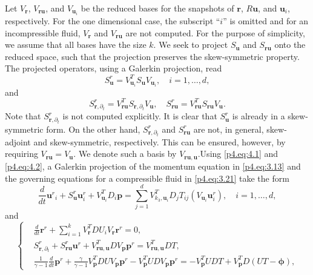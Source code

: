Let $V_{\mathbf r}$, $V_{\mathbf r \mathbf u}$, and $V_{\mathbf u_i}$ be the reduced bases for the snapshots of $\mathbf r$, $R \mathbf u$, and $\mathbf u_i$, respectively. For the one dimensional case, the subscript ``$i$'' is omitted and for an incompressible fluid, $V_{ \mathbf r}$ and $V_{\mathbf r \mathbf u}$ are not computed. For the purpose of simplicity, we assume that all bases have the size $k$. We seek to project $S_{\mathbf u}$ and $S_{\mathbf r \mathbf u}$ onto the reduced space, such that the projection preserves the skew-symmetric property. The projected operators, using a Galerkin projection, read
\begin{equation} \label{p4.eq:4.1}
	S^r _{\mathbf u} = V_{ \mathbf u_i}^T S _{\mathbf u} V_{ \mathbf u_i}, \quad i=1,\dots,d,
\end{equation}
and
\begin{equation} \label{p4.eq:4.2}
	S^r_{\mathbf r ,\partial_t} =V_{\mathbf r \mathbf u}^T  S_{\mathbf r ,\partial_t} V_{\mathbf u}, \quad S^r _{\mathbf r \mathbf u} = V_{\mathbf r \mathbf u}^T  S _{\mathbf r \mathbf u} V_{\mathbf u}.
\end{equation}
Note that $S^r_{\mathbf r ,\partial_t}$ is not computed explicitly. It is clear that $S^r _{\mathbf u}$ is already in a skew-symmetric form. On the other hand, $S^r_{\mathbf r ,\partial_t}$ and $S^r _{\mathbf r \mathbf u}$ are not, in general, skew-adjoint and skew-symmetric, respectively. This can be ensured, however, by requiring $V_{\mathbf r \mathbf u} = V_{\mathbf u}$. We denote such a basis by $V_{\mathbf r \mathbf u, \mathbf u}$.Using \eqref{p4.eq:4.1} and \eqref{p4.eq:4.2}, a Galerkin projection of the momentum equation in \eqref{p4.eq:3.13} and the governing equations for a compressible fluid in \eqref{p4.eq:3.21} take the form
\begin{equation} \label{p4.eq:4.3}
	\frac{d}{dt} {\mathbf u^r}_i + S^r_{\mathbf u} \mathbf u^r_i + V_{\mathbf u_i} ^T D_i \mathbf p = \sum_{j=1}^d V_{k_3, \mathbf u_i}^T D_j T_{ij}(V_{ \mathbf u_i} \mathbf u^r_i), \quad i=1,\dots,d,
\end{equation}
and
\begin{equation} \label{p4.eq:4.4}
\left\{
\begin{aligned}
	& \frac{d}{dt} \mathbf r^r + \sum_{i=1}^k V^T_{\mathbf r}DU_iV_{\mathbf r}\mathbf r^r = 0, \\
	& S^r_{\mathbf r ,\partial_t} + S^r _{\mathbf r \mathbf u} \mathbf u^r + V_{\mathbf r \mathbf u, \mathbf u}^T D V_{\mathbf p} \mathbf p^r = V_{\mathbf r \mathbf u, \mathbf u}^T D T, \\
	&\frac{1}{\gamma -1} \frac{d}{dt} \mathbf p^r + \frac{\gamma}{\gamma -1} V_{\mathbf p}^T D U V_{\mathbf p} \mathbf p^r - V_{\mathbf p}^T UD V_{\mathbf p} \mathbf p^r = - V_{\mathbf p}^T UDT + V_{\mathbf p}^T D(UT - \mathbf \phi),
\end{aligned}
\right.
\end{equation}
